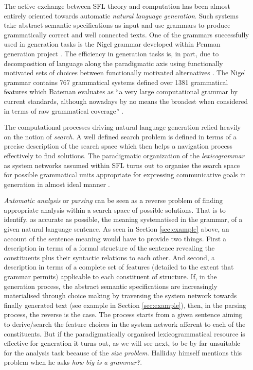 The active exchange between SFL theory and computation has been almost entirely oriented towards automatic \textit{natural language generation}. Such systems take abstract semantic specifications as input and use grammars to produce grammatically correct and well connected texts. One of the grammars successfully used in generation tasks is the Nigel grammar developed within Penman generation project \citep{Mann83}. The efficiency in generation tasks is, in part, due to decomposition of language along the paradigmatic axis using functionally motivated sets of choices between functionally motivated alternatives \citep{McDonald80}. The Nigel grammar contains 767 grammatical systems defined over 1381 grammatical features which Bateman evaluates as ``a very large computational grammar by current standards, although nowadays by no means the broadest when considered in terms of raw grammatical coverage'' \citep[29]{Bateman2008}.

The computational processes driving natural language generation relied heavily on the notion of \textit{search}. A well defined search problem is defined in terms of a precise description of the search space which then helps a navigation process effectively to find solutions. The paradigmatic organization of the \textit{lexicogrammar} as system networks assumed within SFL turns out to organise the search space for possible grammatical units appropriate for expressing communicative goals in generation in almost ideal manner \citep[28]{Bateman2008}.

\textit{Automatic analysis} or \textit{parsing} can be seen as a reverse problem of finding appropriate analysis within a search space of possible solutions. That is to identify, as accurate as possible, the meaning systematised in the grammar, of a given natural language sentence. As seen in Section \ref{sec:example} above, an account of the sentence meaning would have to provide two things. First a description in terms of a formal structure of the sentence revealing the constituents plus their syntactic relations to each other. And second, a description in terms of a complete set of features (detailed to the extent that grammar permits) applicable to each constituent of structure. If, in the generation process, the abstract semantic specifications are increasingly materialised through choice making by traversing the system network towards finally generated text (see example in Section \ref{sec:example}), then, in the parsing process, the reverse is the case. The process starts from a given sentence aiming to derive/search the feature choices in the system network afferent to each of the constituents. But if the paradigmatically organised lexicogrammatical resource is effective for generation it turns out, as we will see next, to be by far unsuitable for the analysis task because of the \textit{size problem}. Halliday himself mentions this problem when he asks \textit{how big is a grammar?}.

